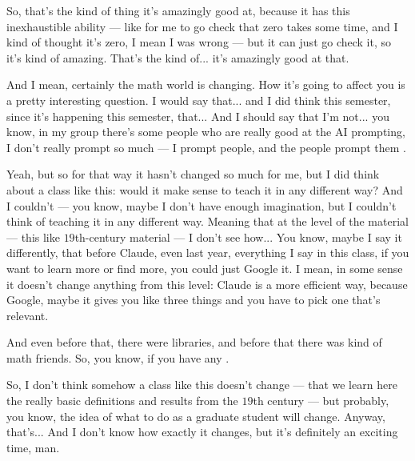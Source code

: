 \begin{speech}[00:45:31 - 00:47:26]
So, that's the kind of thing it's amazingly good at, because it has this inexhaustible ability --- like for me to go check that zero takes some time, and I kind of thought it's zero, I mean I was wrong --- but it can just go check it, so it's kind of amazing. That's the kind of... it's amazingly good at that.

And I mean, certainly the math world is changing. How it's going to affect you is a pretty interesting question. I would say that... and I did think this semester, since it's happening this semester, that... And I should say that I'm not... you know, in my group there's some people who are really good at the AI prompting, I don't really prompt so much --- I prompt people, and the people prompt them .

Yeah, but so for that way it hasn't changed so much for me, but I did think about a class like this: would it make sense to teach it in any different way? And I couldn't --- you know, maybe I don't have enough imagination, but I couldn't think of teaching it in any different way. Meaning that at the level of the material --- this like $19$th-century material --- I don't see how... You know, maybe I say it differently, that before Claude, even last year, everything I say in this class, if you want to learn more or find more, you could just Google it. I mean, in some sense it doesn't change anything from this level: Claude is a more efficient way, because Google, maybe it gives you like three things and you have to pick one that's relevant.

And even before that, there were libraries, and before that there was kind of math friends. So, you know, if you have any .

So, I don't think somehow a class like this doesn't change --- that we learn here the really basic definitions and results from the $19$th century --- but probably, you know, the idea of what to do as a graduate student will change. Anyway, that's... And I don't know how exactly it changes, but it's definitely an exciting time, man.
\end{speech}

\begin{hidden}
\end{hidden}

